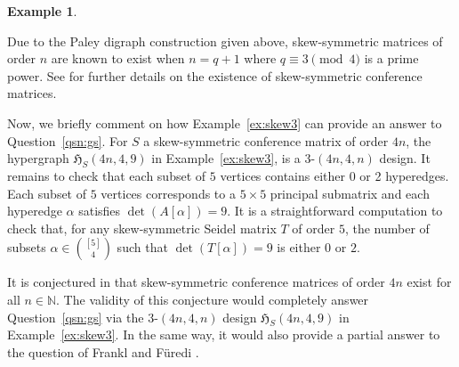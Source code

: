 \documentclass[11pt]{article}
\newtheorem{example}[theorem]{Example}
\begin{document}
\begin{example}
\end{example}

Due to the Paley digraph construction given above, skew-symmetric matrices of order $n$ are known to exist when $n=q+1$ where $q\equiv3\pmod{4}$ is a prime power. 
See \cite[Section 9.3.1]{SY} for further details on the existence of skew-symmetric conference matrices.

Now, we briefly comment on how Example~\ref{ex:skew3} can provide an answer to Question~\ref{qsn:gs}.
For $S$ a skew-symmetric conference matrix of order $4n$, the hypergraph $\mathfrak H_{S}(4n,4,9)$ in Example~\ref{ex:skew3}, is a $3$-$(4n,4,n)$ design. 
It remains to check that each subset of $5$ vertices contains either 0 or 2 hyperedges.
Each subset of $5$ vertices corresponds to a $5 \times 5$ principal submatrix and each hyperedge $\alpha$ satisfies $\det(A[\alpha]) = 9$.
It is a straightforward computation to check that, for any skew-symmetric Seidel matrix $T$ of order $5$, the number of subsets $\alpha \in \binom{[5]}{4}$ such that $\det(T[\alpha]) = 9$ is either $0$ or $2$.


It is conjectured in \cite{S78} that skew-symmetric conference matrices of order $4n$ exist for all $n \in \mathbb N$.
The validity of this conjecture would completely answer Question~\ref{qsn:gs}
via the $3$-$(4n,4,n)$ design $\mathfrak H_{S}(4n,4,9)$ in Example~\ref{ex:skew3}.
In the same way, it would also provide a partial answer to the question of Frankl and F\"{u}redi \cite[Problem~1]{FF}.
\end{document}
